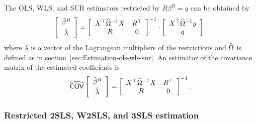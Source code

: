 The OLS, WLS, and SUR estimators restricted by $R \beta^R = q$ can be obtained by
\begin{equation}
   \left[ \begin{array}{c}
      \hat{\beta}^R \\[0.2em] \hat{\lambda}
   \end{array} \right]
   =
   \left[ \begin{array}{cc}
      X^\top \widehat{\Omega}^{-1} X & R^\top \\
      R & 0
   \end{array} \right]^{-1}
   \cdot
   \left[ \begin{array}{c}
      X^\top \widehat{\Omega}^{-1} y \\ q
   \end{array} \right] ,
   \label{eq:ols-wls-sur-r}
\end{equation}
where $\lambda$ is a vector of the Lagrangean multipliers of the restrictions
and $\widehat{\Omega}$ is defined as in section~\ref{sec:Estimation-ols-wls-sur}.
An estimator of the covariance matrix of the estimated coefficients is
\begin{equation}
   \widehat{\mathsf{COV}}
   \left[ \begin{array}{c}
      \hat{\beta}^R \\[0.2em] \hat{\lambda}
   \end{array} \right] 
   = 
   \left[ \begin{array}{cc}
      X^\top \widehat{\Omega}^{-1} X & R^\top \\
      R & 0
   \end{array} \right]^{-1} .
   \label{eq:cov-ols-wls-sur-r}
\end{equation}

\subsubsection{Restricted 2SLS, W2SLS, and 3SLS estimation}

